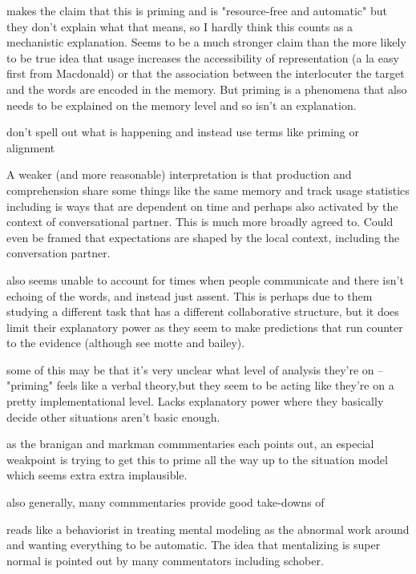 \documentclass[]{article}
\begin{document}
\cite{pickering2004} makes the claim that this is priming and is "resource-free and automatic" but they don't explain what that means, so I hardly think this counts as a mechanistic explanation. Seems to be a much stronger claim than the more likely to be true idea that usage increases the accessibility of representation (a la easy first from Macdonald) or that the association between the interlocuter the target and the words are encoded in the memory. But priming is a phenomena that also needs to be explained on the memory level and so isn't an explanation. 

\cite{pickering2004} don't spell out what is happening and instead use terms like priming or alignment 

A weaker (and more reasonable) interpretation is that production and comprehension share some things like the same memory and track usage statistics including is ways that are dependent on time and perhaps also activated by the context of conversational partner. This is much more broadly agreed to. Could even be framed that expectations are shaped by the local context, including the conversation partner. 

\cite{pickering2004} also seems unable to account for times when people communicate and there isn't echoing of the words, and instead just assent. This is perhaps due to them studying a different task that has a different collaborative structure, but it does limit their explanatory power as they seem to make predictions that run counter to the evidence (although see motte and bailey). 

\cite{pickering2004} some of this may be that it's very unclear what level of analysis they're on -- "priming" feels like a verbal theory,but they seem to be acting like they're on a pretty implementational level. Lacks explanatory power where they basically decide other situations aren't basic enough. 

\cite{pickering} as the branigan and markman commmentaries each points out, an especial weakpoint is trying to get this to prime all the way up to the situation model which seems extra extra implausible. 

also generally, many commmentaries provide good take-downs of \cite{pickering2004}

\cite{pickering2004} reads like a behaviorist in treating mental modeling as the abnormal work around and wanting everything to be automatic. The idea that mentalizing is super normal is pointed out by many commentators including schober. 
\end{document}
